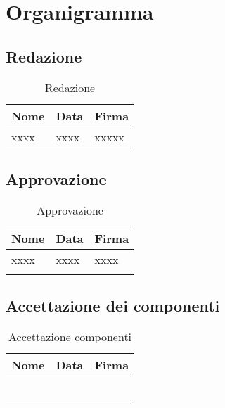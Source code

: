 \section{Organigramma}{
	\subsection{Redazione}{
		\begin{table}[H]
			\centering
		  \begin{tabular}{p{4cm}p{4cm}p{7cm}}
			   \toprule Nome & Data & Firma \\
			   \midrule
			   xxxx & xxxx & xxxxx \\
			   \bottomrule
		 \end{tabular}
		 	\label{tab:Redazione}
		 	\caption{Redazione}
		\end{table}
	}
	\subsection{Approvazione}{
		\begin{table}[H]
			\centering
		  \begin{tabular}{p{5cm}p{3cm}p{7cm}}
			   \toprule Nome & Data & Firma \\
			   \midrule
			   xxxx & xxxx & xxxx \\
			   \Vardanega &  &  \\
			   \bottomrule
		 \end{tabular}
		 	\label{tab:Approvazione}
		 	\caption{Approvazione}
		\end{table}
	}
	\subsection{Accettazione dei componenti}{
		\begin{table}[H]
			\centering
		  \begin{tabular}{p{5cm}p{3cm}p{7cm}}
			   \toprule Nome & Data & Firma \\
			   \midrule
			   \BM & &  \\
			   \FM &  &  \\
			   \GP  & &  \\
			   \PM &  &  \\
			   \TP &  &  \\
			   \VG &  &  \\
			   \bottomrule
		 \end{tabular}
		 	\label{tab:AccettazioneComponenti}
		 	\caption{Accettazione componenti}
		\end{table}
	}
}
